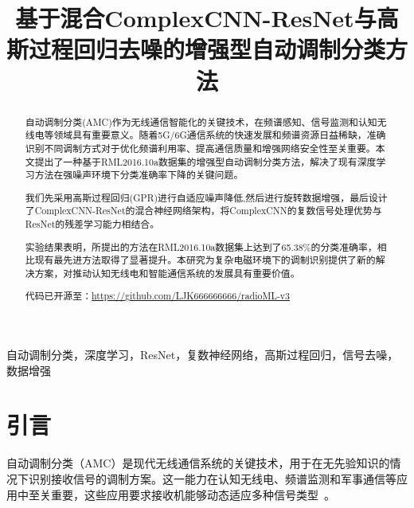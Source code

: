 \documentclass[conference]{IEEEtran}
\begin{document}
\title{基于混合ComplexCNN-ResNet与高斯过程回归去噪的增强型自动调制分类方法}

\author{
}

\maketitle

\begin{abstract}
自动调制分类(AMC)作为无线通信智能化的关键技术，在频谱感知、信号监测和认知无线电等领域具有重要意义。随着5G/6G通信系统的快速发展和频谱资源日益稀缺，准确识别不同调制方式对于优化频谱利用率、提高通信质量和增强网络安全性至关重要。本文提出了一种基于RML2016.10a数据集的增强型自动调制分类方法，解决了现有深度学习方法在强噪声环境下分类准确率下降的关键问题。

我们先采用高斯过程回归(GPR)进行自适应噪声降低,然后进行旋转数据增强，最后设计了ComplexCNN-ResNet的混合神经网络架构，将ComplexCNN的复数信号处理优势与ResNet的残差学习能力相结合。

实验结果表明，所提出的方法在RML2016.10a数据集上达到了65.38\%的分类准确率，相比现有最先进方法取得了显著提升。本研究为复杂电磁环境下的调制识别提供了新的解决方案，对推动认知无线电和智能通信系统的发展具有重要价值。

代码已开源至：\url{https://github.com/LJK666666666/radioML-v3}
\end{abstract}

\begin{IEEEkeywords}
自动调制分类，深度学习，ResNet，复数神经网络，高斯过程回归，信号去噪，数据增强
\end{IEEEkeywords}


\section{引言}
自动调制分类（AMC）是现代无线通信系统的关键技术，用于在无先验知识的情况下识别接收信号的调制方案。这一能力在认知无线电、频谱监测和军事通信等应用中至关重要，这些应用要求接收机能够动态适应多种信号类型~\cite{dobre2007survey}。
\end{document}
